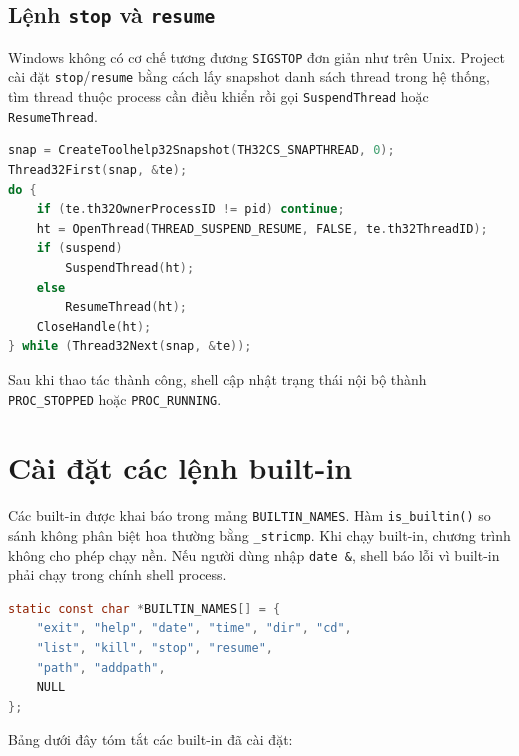 \documentclass[13pt,a4paper,oneside]{extreport}
\begin{document}
\subsection{Lệnh \texttt{stop} và \texttt{resume}}

Windows không có cơ chế tương đương \texttt{SIGSTOP} đơn giản như trên Unix. Project cài đặt \texttt{stop}/\texttt{resume} bằng cách lấy snapshot danh sách thread trong hệ thống, tìm thread thuộc process cần điều khiển rồi gọi \texttt{SuspendThread} hoặc \texttt{ResumeThread}.

\begin{lstlisting}[language=C,caption={Ý tưởng dừng/tiếp tục toàn bộ thread của một process}]
snap = CreateToolhelp32Snapshot(TH32CS_SNAPTHREAD, 0);
Thread32First(snap, &te);
do {
    if (te.th32OwnerProcessID != pid) continue;
    ht = OpenThread(THREAD_SUSPEND_RESUME, FALSE, te.th32ThreadID);
    if (suspend)
        SuspendThread(ht);
    else
        ResumeThread(ht);
    CloseHandle(ht);
} while (Thread32Next(snap, &te));
\end{lstlisting}

Sau khi thao tác thành công, shell cập nhật trạng thái nội bộ thành \texttt{PROC\_STOPPED} hoặc \texttt{PROC\_RUNNING}.

\section{Cài đặt các lệnh built-in}

Các built-in được khai báo trong mảng \texttt{BUILTIN\_NAMES}. Hàm \texttt{is\_builtin()} so sánh không phân biệt hoa thường bằng \texttt{\_stricmp}. Khi chạy built-in, chương trình không cho phép chạy nền. Nếu người dùng nhập \texttt{date \&}, shell báo lỗi vì built-in phải chạy trong chính shell process.

\begin{lstlisting}[language=C,caption={Danh sách built-in commands}]
static const char *BUILTIN_NAMES[] = {
    "exit", "help", "date", "time", "dir", "cd",
    "list", "kill", "stop", "resume",
    "path", "addpath",
    NULL
};
\end{lstlisting}

Bảng dưới đây tóm tắt các built-in đã cài đặt:
\end{document}
